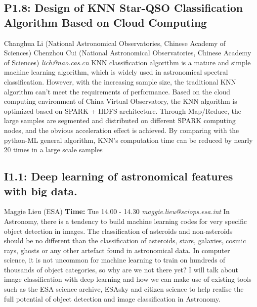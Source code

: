 \documentclass{report}
\begin{document}
\subsection*{P1.8: Design of KNN Star-QSO Classification Algorithm Based on Cloud Computing}
\bigskip
Changhua Li (National Astronomical Observatories, Chinese Academy of Sciences) \newline Chenzhou Cui (National Astronomical Observatories, Chinese Academy of Sciences) \newline   \newline   \newline  \newline  \newline\newline
{\it lich@nao.cas.cn}\newline
\newline\newline
KNN classification algorithm is a mature and simple machine learning algorithm, which is widely used in astronomical spectral classification. However, with the increasing sample size, the traditional KNN algorithm can’t meet the requirements of performance. Based on the cloud computing environment of China Virtual Observatory, the KNN algorithm is optimized based on SPARK + HDFS architecture. Through Map/Reduce, the large samples are segmented and distributed on different SPARK computing nodes, and the obvious acceleration effect is achieved. By comparing with the python-ML general algorithm, KNN's computation time can be reduced by nearly 20 times in a large scale samples\newline
\newpage
\subsection*{I1.1: Deep learning of astronomical features with big data.}
\bigskip
Maggie Lieu (ESA) \newline   \newline   \newline   \newline  \newline  \newline\newline
{\bf Time:} Tue 14.00 - 14.30\newline
\newline
{\it maggie.lieu@sciops.esa.int}\newline
\newline\newline
In Astronomy, there is a tendency to build machine learning codes for very specific object detection in images. The classification of asteroids and non-asteroids should be no different than the classification of asteroids, stars, galaxies, cosmic rays, ghosts or any other artefact found in astronomical data. In computer science, it is not uncommon for machine learning to train on hundreds of thousands of object categories, so why are we not there yet? I will talk about image classification with deep learning and how we can make use of existing tools such as the ESA science archive, ESAsky and citizen science to help realise the full potential of object detection and image classification in Astronomy.\newline
\newpage
\end{document}
